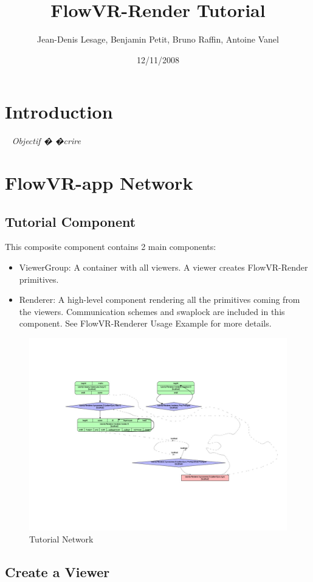 \documentclass[a4paper,12pt,titlepage]{article}
\author{Jean-Denis Lesage, Benjamin Petit, Bruno Raffin, Antoine Vanel}
\title{FlowVR-Render Tutorial}
\date{12/11/2008}
\newcommand{\more}[1]{\label{A VOIR !!!!} \fbox{A VOIR}\ {\small{ \em #1}}}
\begin{document}
\maketitle
\section{Introduction}
\more{Objectif � �crire}

\section{FlowVR-app Network}
\subsection{Tutorial Component}
This composite component contains 2 main components:
\begin{itemize}
    \item ViewerGroup: A container with all viewers. A viewer creates FlowVR-Render primitives.
    \item Renderer: A high-level component rendering all the primitives coming from the viewers. Communication schemes and swaplock are included in this component. See FlowVR-Renderer Usage Example for more details.
\end{itemize}

\begin{figure}[ht]
    \includegraphics[width=\textwidth]{figures/network.jpg}
    \caption{Tutorial Network}
\end{figure}

\subsection{Create a Viewer}
\end{document}
